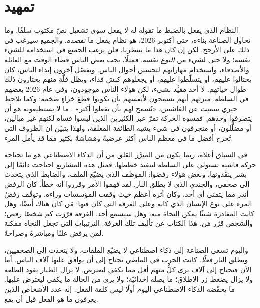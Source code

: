 \chapter*{تمهيد}
النظام الذي يفعل بالضبط ما تقوله له لا يفعل سوى تشغيل نصّ مكتوب سلفًا. وما تحاول الصناعة بناءه، حتى أكتوبر 2026، هو نظام يفعل ما \emph{تقصده}. والجميع سيرغب في ذلك على الأرجح. لكن إن كان هذا ما ينتظرنا، فلن يرغب الجميع في استخدامه للشيء نفسه؛ ولا حتى لشيء من \emph{النوع} نفسه. فمثلًا، يحب بعض الناس قضاء الوقت مع العائلة والأصدقاء، واستخدام مهاراتهم لتحسين أحوال الناس. ويفضّل آخرون إيذاء الناس، كأن يحتالوا عليهم، أو يتسلّطوا عليهم، أو يجعلوهم كبش فداء، ويظل قلّة منهم يختارون ذلك طوال حياتهم. لا أحد مقيَّد بشيء، لكن هؤلاء الناس موجودون، وفي عام 2026 بعضهم في السلطة. ميزتهم أنهم يسمحون لأنفسهم بأن يكونوا قطعَ خراءٍ ضخمة: وكما يلاحظ جيري سميث عن الفاشيين، «يُسمح لهم بأن يفعلوا أكثر» \autocite{rickandmorty2023}. ما لا يستطيعونه هو أن يتصرفوا وحدهم. فقسوة الحركة تمرّ عبر الكثيرين الذين ليسوا قساة لكنهم غير مبالين، أو مضلَّلون، أو منجرفون في شيء يشبه الطائفة المغلقة، ولهذا يتبيّن أن الظروف التي تُخرج أفضل ما في معظم الناس أكثر عرضيةً وهشاشةً بكثير مما قد يأمل المرء.

في السياق أعلاه، ربما يكون من المبرَّر القلق من أن الذكاء الاصطناعي هو ما تحتاجه حركة فاشية تستولي على السلطة لتنفيذ خططها. فمثل هذه المشاريع احتاجت دائمًا إلى \emph{بشر} ينفّذونها، وبعض هؤلاء رفضوا: الموظف الذي يضيّع الملف، والضابط الذي يتحدث إلى صحفي، والجندي الذي لا يطلق النار. لقد فهموا الأمر وقرروا أنه خطأ. كان الرفض أندر مما يتمنى أي أحد، وكان أثره أعظم حيث وقفت المؤسسات وراءه. وتوقّف رفضُ المرء على نوع الإنسان الذي كانه وعلى الغرفة التي كان فيها: مَن كان هناك أيضًا، وهل كانت المغادرة شيئًا يمكن النجاة منه، وهل سيسمع أحد. الغرفة قرّرت كم شخصًا رفض؛ والشخص قرّر مَن. هذا الكتاب عن تأليف تلك الغرفة: الترتيبات التي تجعل النجاة ممكنة لمن يرفض علنًا ومباشرةً وصراحةً.

واليوم تسعى الصناعة إلى ذكاء اصطناعي لا يضيّع الملفات، ولا يتحدث إلى الصحفيين، ويطلق النار \emph{فعلًا}. كانت الحرب في الماضي تحتاج إلى أن يوافق عليها آلاف الناس. أما الآن فتحتاج إلى آلاف يرى كلٌّ منهم أقل مما يكفي ليعترض. لا يزال الطيار يقود الطلعة ولا يزال يضغط زر الإطلاق؛ ما يصله إحداثيّة؛ ولا يرى من الحالة ما يكفي ليعترض عليها. ما يخفّضه الذكاء الاصطناعي اليوم أولًا ليس كلفة الفعل. إنه عدد الأشخاص الذين يعرفون ما هو الفعل قبل أن يقع.

